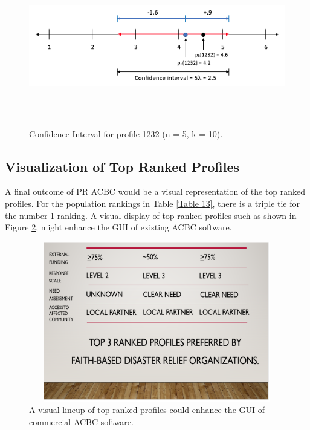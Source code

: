\documentclass[a4paper, 12pt]{article}
\begin{document}
\begin{figure}[!htpb]
\centering
\includegraphics[width=5.75in, height=2.75in]{Confidence_Interval_2.png}
\caption{Confidence Interval for profile 1232 (n = 5, k = 10).}
\label{fig:4}
\end{figure}

\subsection{Visualization of Top Ranked Profiles}
A final outcome of PR ACBC would be a visual representation of the top ranked profiles. For the population rankings in Table \ref{Table 13}, there is a triple tie for the number 1 ranking.  A visual display of top-ranked profiles such as shown in Figure \ref{fig:6}, might enhance the GUI of existing ACBC software.

\begin{figure}[!htpb]
\centering
\includegraphics[width=5.75in, height=2.75in]{Fig6.png}
\caption{A visual lineup of top-ranked profiles could enhance the GUI of commercial ACBC software.}
\label{fig:6}
\end{figure}
\end{document}
